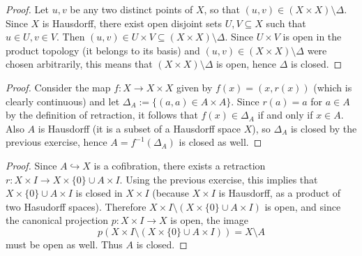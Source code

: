 \documentclass[12pt,a4paper]{article}
\newcounter{exercise}
\begin{document}
\pagestyle{fancy}                      %
\fancyhf{}                             %
\addtolength{\topmargin}{-30 pt}                   %
\setlength{\headsep}{10 pt}                      %
\renewcommand{\headrulewidth}{1 pt}                %
\renewcommand*{\proofname}{Solution}
\setcounter{exercise}{2}
\ex\mbox{} 
\begin{proof}
Let $u,v$ be any two distinct points of $X$, so that $(u,v)\in (X\times X) \setminus \Delta$. Since $X$ is Hausdorff, there exist open disjoint sets $U,V\subseteq X$ such that $u\in U, v\in V$. Then $(u,v)\in U\times V\subseteq (X\times X) \setminus \Delta$. Since $U\times V$ is open in the product topology (it belongs to its basis) and $(u,v)\in (X\times X) \setminus \Delta$ were chosen arbitrarily, this means that $(X\times X) \setminus \Delta$ is open, hence $\Delta$ is closed.
\end{proof}

\ex\mbox{} 
\begin{proof}
Consider the map $f:X\to X\times X$ given by $f(x)=(x,r(x))$ (which is clearly continuous) and let $\Delta_A:=\{(a,a)\in A\times A\}$. Since $r(a)=a$ for $a\in A$ by the definition of retraction, it follows that $f(x)\in \Delta_A$ if and only if $x\in A$. Also $A$ is Hausdorff (it is a subset of a Hausdorff space $X$), so $\Delta_A$ is closed by the previous exercise, hence $A=f^{-1}(\Delta_A)$ is closed as well.
\end{proof}

\ex\mbox{} 
\begin{proof}
Since $A \hookrightarrow X$ is a cofibration, there exists a retraction $r:X\times I\to X\times\{0\}\cup A\times I$. Using the previous exercise, this implies that $X\times\{0\}\cup A\times I$ is closed in $X\times I$ (because $X\times I$ is Hausdorff, as a product of two Hasudorff spaces). Therefore $X\times I\setminus(X\times\{0\}\cup A\times I)$ is open, and since the canonical projection $p:X\times I\to X$ is open, the image $$p(X\times I\setminus(X\times\{0\}\cup A\times I))=X\setminus A$$
must be open as well. Thus $A$ is closed.
\end{proof}
\end{document}
